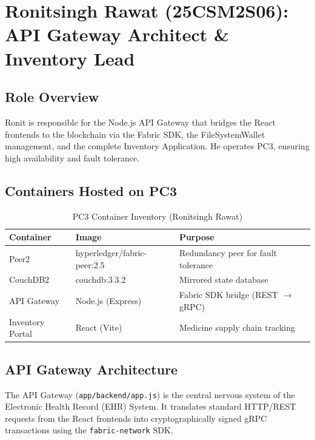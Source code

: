 \clearpage

\section{Ronitsingh Rawat (25CSM2S06): API Gateway Architect \& Inventory Lead}

\subsection{Role Overview}
Ronit is responsible for the Node.js API Gateway that bridges the React frontends to the blockchain via the Fabric SDK, the FileSystemWallet management, and the complete Inventory Application. He operates PC3, ensuring high availability and fault tolerance.

\subsection{Containers Hosted on PC3}

\begin{table}[h]
\centering
\caption{PC3 Container Inventory (Ronitsingh Rawat)}
\label{tab:ronit_containers}
\begin{tabular}{|l|l|p{6cm}|}
\hline
\textbf{Container} & \textbf{Image} & \textbf{Purpose} \\
\hline
Peer2 & hyperledger/fabric-peer:2.5 & Redundancy peer for fault tolerance \\
\hline
CouchDB2 & couchdb:3.3.2 & Mirrored state database \\
\hline
API Gateway & Node.js (Express) & Fabric SDK bridge (REST $\to$ gRPC) \\
\hline
Inventory Portal & React (Vite) & Medicine supply chain tracking \\
\hline
\end{tabular}
\end{table}

\subsection{API Gateway Architecture}

The API Gateway (\texttt{app/backend/app.js}) is the central nervous system of the Electronic Health Record (EHR) System. It translates standard HTTP/REST requests from the React frontends into cryptographically signed gRPC transactions using the \texttt{fabric-network} SDK.

